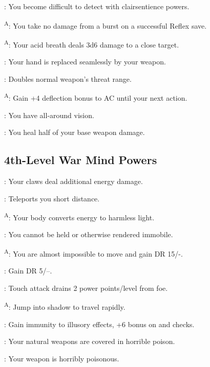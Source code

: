 : You become difficult to detect with clairsentience powers.

\textsuperscript{A}: You take no damage from a burst on a successful Reflex save.

\textsuperscript{A}: Your acid breath deals 3d6 damage to a close target.

: Your hand is replaced seamlessly by your weapon.

: Doubles normal weapon's threat range.

\textsuperscript{A}: Gain +4 deflection bonus to AC until your next action.

: You have all-around vision.

: You heal half of your base weapon damage.




\subsection{4th-Level War Mind Powers}

: Your claws deal additional energy damage.

: Teleports you short distance.

\textsuperscript{A}: Your body converts energy to harmless light.

: You cannot be held or otherwise rendered immobile.

\textsuperscript{A}: You are almost impossible to move and gain DR 15/-.

: Gain DR 5/--.

: Touch attack drains 2 power points/level from foe.

\textsuperscript{A}: Jump into shadow to travel rapidly. %

: Gain immunity to illusory effects, +6 bonus on  and  checks.

: Your natural weapons are covered in horrible poison.

: Your weapon is horribly poisonous.

